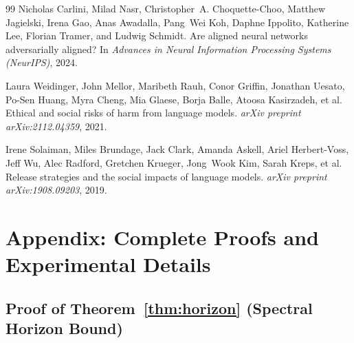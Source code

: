 \documentclass[10pt,twocolumn]{article}
\begin{document}
\begin{thebibliography}{99}
Nicholas Carlini, Milad Nasr, Christopher~A. Choquette-Choo, Matthew Jagielski, Irena Gao, Anas Awadalla, Pang~Wei Koh, Daphne Ippolito, Katherine Lee, Florian Tramer, and Ludwig Schmidt.
\newblock Are aligned neural networks adversarially aligned?
\newblock In \emph{Advances in Neural Information Processing Systems (NeurIPS)}, 2024.

Laura Weidinger, John Mellor, Maribeth Rauh, Conor Griffin, Jonathan Uesato, Po-Sen Huang, Myra Cheng, Mia Glaese, Borja Balle, Atoosa Kasirzadeh, et al.
\newblock Ethical and social risks of harm from language models.
\newblock \emph{arXiv preprint arXiv:2112.04359}, 2021.

Irene Solaiman, Miles Brundage, Jack Clark, Amanda Askell, Ariel Herbert-Voss, Jeff Wu, Alec Radford, Gretchen Krueger, Jong~Wook Kim, Sarah Kreps, et al.
\newblock Release strategies and the social impacts of language models.
\newblock \emph{arXiv preprint arXiv:1908.09203}, 2019.

\end{thebibliography}


\appendix
\section{Appendix: Complete Proofs and Experimental Details}
\label{sec:appendix}

\subsection{Proof of Theorem~\ref{thm:horizon} (Spectral Horizon Bound)}
\label{proof:horizon}
\end{document}
